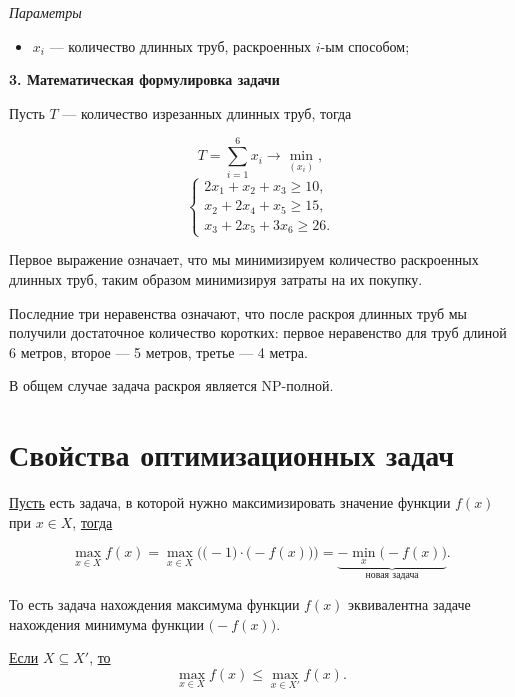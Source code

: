 \bigskip

\textit{Параметры}

\begin{itemize}[nosep]
	\item $x_i$ --- количество длинных труб, раскроенных $i$-ым способом;
\end{itemize}

\bigskip

\textbf{3. Математическая формулировка задачи}

Пусть $T$ --- количество изрезанных длинных труб, тогда

\[
T = \sum_{i=1}^6 x_i \to \min_{(x_i)},
\]
\[
\begin{cases}
	2x_1 + x_2 + x_3 \ge 10, \\
	x_2 + 2x_4 + x_5 \ge 15, \\
	x_3 + 2x_5 + 3x_6 \ge 26.
\end{cases}
\]

Первое выражение означает, что мы минимизируем количество раскроенных длинных труб, таким образом минимизируя затраты на их покупку.

Последние три неравенства означают, что после раскроя длинных труб мы получили достаточное количество коротких: первое неравенство для труб длиной 6 метров, второе --- 5 метров, третье --- 4 метра.

\remark

В общем случае задача раскроя является NP-полной.

\section{Свойства оптимизационных задач}


\underline{Пусть} есть задача, в которой нужно максимизировать значение функции $f(x)$ при $x \in X$, \underline{тогда}

\[\max_{x \in X} f(x) = \max_{x \in X} \Big(\big(-1\big) \cdot \big(-f(x)\big)\Big) = \underbrace{-\min_x \big(-f(x)\big)}_{\text{новая задача}}.\]

То есть задача нахождения максимума функции $f(x)$ эквивалентна задаче нахождения минимума функции $\big(-f(x)\big)$.


\underline{Если} $X \subseteq X'$, \underline{то}
\[
\max_{x \in X} f(x) \le \max_{x \in X'} f(x).
\]



